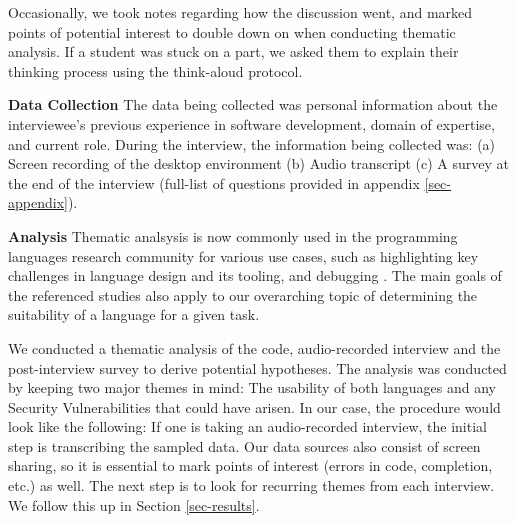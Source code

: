 Occasionally, we took notes regarding how the discussion went, and marked points of potential interest to double down on when conducting thematic analysis. If a student was stuck on a part, we asked them to explain their thinking process using the think-aloud protocol.

 
\noindent
\textbf{Data Collection} The data being collected was personal information about the interviewee's previous experience in software development, domain of expertise, and current role. During the interview, the information being collected was: (a) Screen recording of the desktop environment (b) Audio transcript (c) A survey at the end of the interview (full-list of questions provided in appendix \ref{sec-appendix}). \label{survey} \label{sec:dataCollection}


\noindent
\textbf{Analysis} Thematic analsysis is now commonly used in the programming languages research community for various use cases, such as highlighting key challenges in language design \cite{Coblenz2023} and its tooling, and debugging \cite{Huang2023}. The main goals of the referenced studies also apply to our overarching topic of determining the suitability of a language for a given task.

We conducted a thematic analysis of the code, audio-recorded interview and the post-interview survey to derive potential hypotheses. The analysis was conducted by keeping two major themes in mind: The usability of both languages and any Security Vulnerabilities that could have arisen. In our case, the procedure would look like the following: If one is taking an audio-recorded interview, the initial step is transcribing the sampled data. Our data sources also consist of screen sharing, so it is essential to mark points of interest (errors in code, completion, etc.) as well. The next step is to look for recurring themes from each interview. We follow this up in Section \ref{sec-results}.
